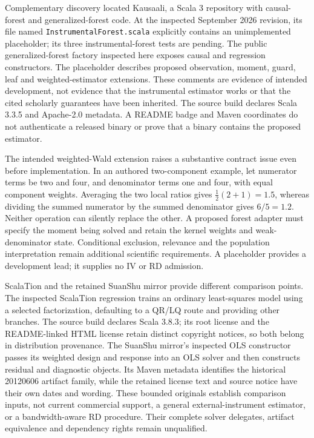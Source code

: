 Complementary discovery located Kausaali, a Scala 3 repository with causal-forest and generalized-forest code. At the inspected September 2026 revision, its file named \texttt{InstrumentalForest.scala} explicitly contains an unimplemented placeholder; its three instrumental-forest tests are pending. The public generalized-forest factory inspected here exposes causal and regression constructors. The placeholder describes proposed observation, moment, guard, leaf and weighted-estimator extensions. These comments are evidence of intended development, not evidence that the instrumental estimator works or that the cited scholarly guarantees have been inherited. The source build declares Scala 3.3.5 and Apache-2.0 metadata. A README badge and Maven coordinates do not authenticate a released binary or prove that a binary contains the proposed estimator.\citep{exec25_javaiv_kausaali}

The intended weighted-Wald extension raises a substantive contract issue even before implementation. In an authored two-component example, let numerator terms be two and four, and denominator terms one and four, with equal component weights. Averaging the two local ratios gives $\tfrac12(2+1)=1.5$, whereas dividing the summed numerator by the summed denominator gives $6/5=1.2$. Neither operation can silently replace the other. A proposed forest adapter must specify the moment being solved and retain the kernel weights and weak-denominator state. Conditional exclusion, relevance and the population interpretation remain additional scientific requirements. A placeholder provides a development lead; it supplies no IV or RD admission.\citep{exec25_javaiv_kausaali,exec25_javaiv_choice}

ScalaTion and the retained SuanShu mirror provide different comparison points. The inspected ScalaTion regression trains an ordinary least-squares model using a selected factorization, defaulting to a QR/LQ route and providing other branches. The source build declares Scala 3.8.3; its root license and the README-linked HTML license retain distinct copyright notices, so both belong in distribution provenance. The SuanShu mirror's inspected OLS constructor passes its weighted design and response into an OLS solver and then constructs residual and diagnostic objects. Its Maven metadata identifies the historical 20120606 artifact family, while the retained license text and source notice have their own dates and wording. These bounded originals establish comparison inputs, not current commercial support, a general external-instrument estimator, or a bandwidth-aware RD procedure. Their complete solver delegates, artifact equivalence and dependency rights remain unqualified.\citep{exec25_javaiv_scalation,exec25_javaiv_suan}

